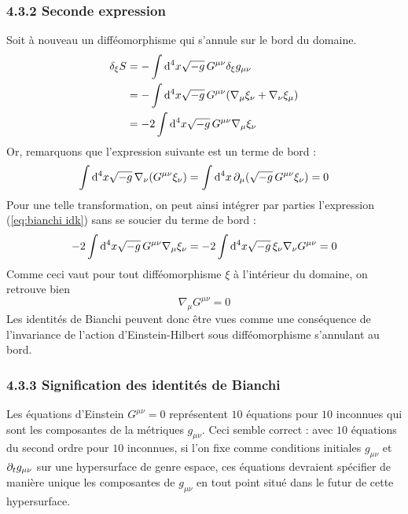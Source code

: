 \subsubsection{4.3.2 Seconde expression}
Soit à nouveau un difféomorphisme qui s'annule sur le bord du domaine.
\begin{align}
     \delta_{\xi}S &= - \int \mathrm{d} ^4x \sqrt{-g}\, G^{\mu \nu}\delta_{\xi}g_{\mu \nu}\\
     &=- \int \mathrm{d} ^4x \sqrt{-g} \, G^{\mu \nu}(\nabla_{\mu}\xi_{\nu} + \nabla_{\nu}\xi_{\mu})\\
     \label{eq:bianchi idk}
     &=- 2\int \mathrm{d} ^4x \sqrt{-g}\, G^{\mu \nu}\nabla_{\mu}\xi_{\nu}
\end{align}
Or, remarquons que l'expression suivante est un terme de bord :
\begin{equation}
    \int \mathrm{d} ^4x \sqrt{-g}\,\nabla_{\nu}(G^{\mu \nu} \xi_{\nu}) =  \int \mathrm{d} ^4x \, \partial_{\mu}(\sqrt{-g}\,G^{\mu \nu} \xi_{\nu}) = 0 
\end{equation}
Pour une telle transformation, on peut ainsi intégrer par parties l'expression (\ref{eq:bianchi idk}) sans se soucier du terme de bord :
\begin{equation}
    - 2\int \mathrm{d} ^4x \sqrt{-g} \, G^{\mu \nu}\nabla_{\mu}\xi_{\nu} =-  2\int \mathrm{d} ^4x \sqrt{-g}\, \xi_{\nu}\nabla_{\nu}G^{\mu \nu} = 0 
\end{equation}
Comme ceci vaut pour tout difféomorphisme $\xi$ à l'intérieur du domaine, on retrouve bien
\begin{equation}
    \boxed{\nabla_{\mu}G^{\mu \nu} = 0}
\end{equation}
Les identités de Bianchi peuvent donc être vues comme une conséquence de l'invariance de l'action d'Einstein-Hilbert sous difféomorphisme s'annulant au bord. 

\subsubsection{4.3.3 Signification des identités de Bianchi}

Les équations d'Einstein $G^{\mu \nu} = 0$ représentent $10$ équations pour $10$ inconnues qui sont les composantes de la métriques $g_{\mu\nu}$. Ceci semble correct : avec $10$ équations du second ordre pour $10$ inconnues, si l'on fixe comme conditions initiales $g_{\mu\nu}$ et $\partial_t g_{\mu\nu}$ sur une hypersurface de genre espace, ces équations devraient spécifier de manière unique les composantes de $g_{\mu\nu}$ en tout point situé dans le futur de cette hypersurface.

